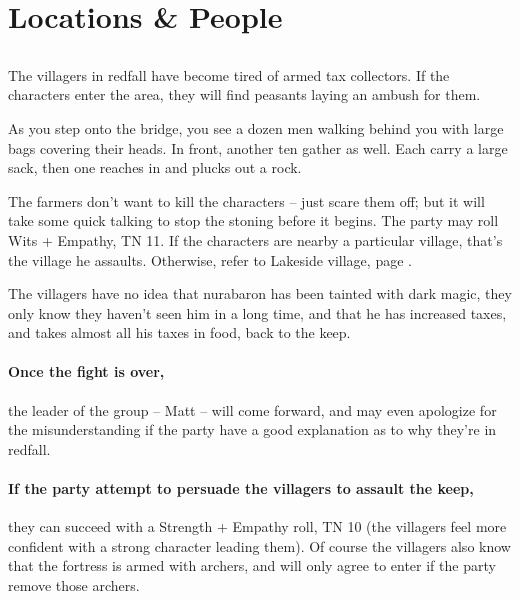 \section{Locations \& People}

\subsection{}

\begin{multicols}{2}


\noindent The villagers in \gls{redfall} have become tired of armed tax collectors.  If the characters enter the area, they will find peasants laying an ambush for them.

\begin{boxtext}

	As you step onto the bridge, you see a dozen men walking behind you with large bags covering their heads.  In front, another ten gather as well.  Each carry a large sack, then one reaches in and plucks out a rock.

\end{boxtext}

The farmers don't want to kill the characters -- just scare them off; but it will take some quick talking to stop the stoning before it begins.  The party may roll Wits + Empathy, TN 11.
If the characters are nearby a particular village, that's the village he assaults.
Otherwise, refer to Lakeside village, page \pageref{lakeside}.

The villagers have no idea that \gls{nurabaron} has been tainted with dark magic, they only know they haven't seen him in a long time, and that he has increased taxes, and takes almost all his taxes in food, back to the keep.


\paragraph{Once the fight is over,}
the leader of the group -- Matt -- will come forward, and may even apologize for the misunderstanding if the party have a good explanation as to why they're in \gls{redfall}.

\paragraph{If the party attempt to persuade the villagers to assault the keep,}
they can succeed with a Strength + Empathy roll, TN 10
(the villagers feel more confident with a strong character leading them).
Of course the villagers also know that the fortress is armed with archers, and will only agree to enter if the party remove those archers.


\end{multicols}

